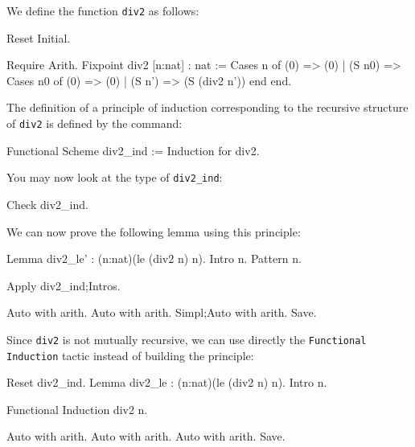 \begin{coq_example*}
We define the function \texttt{div2} as follows:

\begin{coq_eval}
Reset Initial.
\end{coq_eval}

\begin{coq_example*}
Require Arith.
Fixpoint div2 [n:nat] : nat :=
 Cases n of
   (0) => (0)
   | (S n0) => Cases n0 of
                    (0) => (0)
                  | (S n') => (S (div2 n'))
                 end
 end.
\end{coq_example*}

The definition of a principle of induction corresponding to the
recursive structure of \texttt{div2} is defined by the command:

\begin{coq_example}
Functional Scheme div2_ind := Induction for div2.
\end{coq_example}

You may now look at the type of {\tt div2\_ind}:

\begin{coq_example}
Check div2_ind.
\end{coq_example}

We can now prove the following lemma using this principle:


\begin{coq_example*}
Lemma div2_le' : (n:nat)(le (div2 n) n).
Intro n. Pattern n.
\end{coq_example*}


\begin{coq_example}
Apply div2_ind;Intros.
\end{coq_example}

\begin{coq_example*}
Auto with arith.
Auto with arith.
Simpl;Auto with arith.
Save.
\end{coq_example*}

Since \texttt{div2} is not mutually recursive, we can use
directly the \texttt{Functional Induction} tactic instead of
building the principle:

\begin{coq_example*}
Reset div2_ind.
Lemma div2_le : (n:nat)(le (div2 n) n).
Intro n.
\end{coq_example*}

\begin{coq_example}
Functional Induction div2 n.
\end{coq_example}

\begin{coq_example*}
Auto with arith.
Auto with arith.
Auto with arith.
Save.
\end{coq_example*}


\end{coq_example*}
